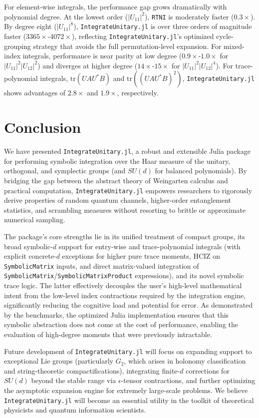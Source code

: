 \documentclass[manuscript,screen]{acmart}
\begin{document}
For element-wise integrals, the performance gap grows dramatically with
polynomial degree. At the lowest order ($|U_{11}|^2$), \texttt{RTNI} is
moderately faster ($0.3\times$). By degree eight ($|U_{11}|^8$),
\texttt{IntegrateUnitary.jl} is over three orders of magnitude faster
($3365\times$-$4072\times$), reflecting \texttt{IntegrateUnitary.jl}'s optimized
cycle-grouping strategy that avoids the full permutation-level expansion. For
mixed-index integrals, performance is near parity at low degree
($0.9\times$-$1.0\times$ for $|U_{11}|^2|U_{12}|^2$) and diverges at higher
degree ($14\times$-$15\times$ for $|U_{11}|^2|U_{12}|^4$). For trace-polynomial
integrals, $\mathrm{tr}(UAU^\ast B)$ and $\mathrm{tr}((UAU^\ast B)^2)$,
\texttt{IntegrateUnitary.jl} shows advantages of $2.8\times$ and $1.9\times$,
respectively.

\section{Conclusion}
\label{sec:conclusion}
We have presented \texttt{IntegrateUnitary.jl}, a robust and extensible Julia package for
performing symbolic integration over the Haar measure of the unitary,
orthogonal, and symplectic groups (and $SU(d)$ for balanced polynomials). By bridging the gap between the
abstract theory of Weingarten calculus and practical computation,
\texttt{IntegrateUnitary.jl} empowers researchers to rigorously derive properties of random
quantum channels, higher-order entanglement statistics, and scrambling measures
without resorting to brittle or approximate numerical sampling.

The package's core strengths lie in its unified treatment of compact groups,
its broad symbolic-$d$ support for entry-wise and trace-polynomial integrals
(with explicit concrete-$d$ exceptions for higher pure trace moments, HCIZ
on \texttt{SymbolicMatrix} inputs, and direct matrix-valued integration of
\texttt{SymbolicMatrix}/\texttt{SymbolicMatrixProduct} expressions), and its
novel symbolic trace logic. The latter effectively decouples the user's high-level
mathematical intent from the low-level index contractions required by the integration
engine, significantly reducing the cognitive load and potential for error. As
demonstrated by the benchmarks, the optimized Julia implementation ensures that
this symbolic abstraction does not come at the cost of performance, enabling the
evaluation of high-degree moments that were previously intractable.

Future development of \texttt{IntegrateUnitary.jl} will focus on expanding support to
exceptional Lie groups (particularly $G_2$, which arises in holonomy
classification and string-theoretic compactifications), integrating finite-$d$
corrections for $SU(d)$ beyond the stable range via $\epsilon$-tensor
contractions, and further optimizing the asymptotic expansion engine for
extremely large-scale problems. We believe \texttt{IntegrateUnitary.jl} will become an
essential utility in the toolkit of theoretical physicists and quantum
information scientists.
\end{document}
